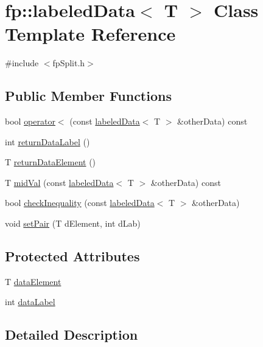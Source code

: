 \hypertarget{classfp_1_1labeledData}{}\section{fp\+:\+:labeled\+Data$<$ T $>$ Class Template Reference}
\label{classfp_1_1labeledData}


{\ttfamily \#include $<$fp\+Split.\+h$>$}

\subsection*{Public Member Functions}
\begin{DoxyCompactItemize}
\item 
bool \hyperlink{classfp_1_1labeledData_a18a9d8880e5789ae4674ce2c675d74b3}{operator$<$} (const \hyperlink{classfp_1_1labeledData}{labeled\+Data}$<$ T $>$ \&other\+Data) const
\item 
int \hyperlink{classfp_1_1labeledData_a8e58e52ea65c0406455e62a67c7bbd0e}{return\+Data\+Label} ()
\item 
T \hyperlink{classfp_1_1labeledData_a63eca05703f41a3f747c0cfe1b89731e}{return\+Data\+Element} ()
\item 
T \hyperlink{classfp_1_1labeledData_ae55f357a65fd80b3ebf50a2e9467c5ad}{mid\+Val} (const \hyperlink{classfp_1_1labeledData}{labeled\+Data}$<$ T $>$ \&other\+Data) const
\item 
bool \hyperlink{classfp_1_1labeledData_af0ac4ee41fe9b5d4d50fd58b2839027a}{check\+Inequality} (const \hyperlink{classfp_1_1labeledData}{labeled\+Data}$<$ T $>$ \&other\+Data)
\item 
void \hyperlink{classfp_1_1labeledData_aea8710b6f8eb99fe23d8ac05eab51980}{set\+Pair} (T d\+Element, int d\+Lab)
\end{DoxyCompactItemize}
\subsection*{Protected Attributes}
\begin{DoxyCompactItemize}
\item 
T \hyperlink{classfp_1_1labeledData_a02564fc812e8a1f4d4ca6edab114d246}{data\+Element}
\item 
int \hyperlink{classfp_1_1labeledData_a833f4ca245e8c17b8d28c50dc3922eef}{data\+Label}
\end{DoxyCompactItemize}


\subsection{Detailed Description}
